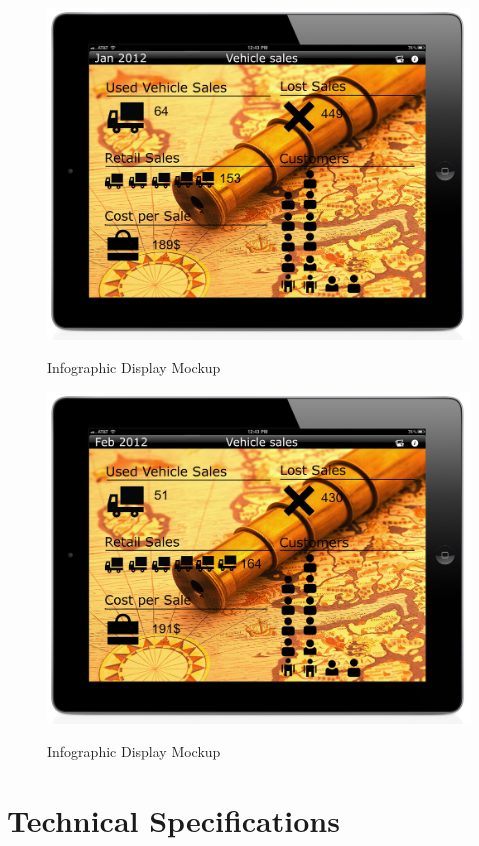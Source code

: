 \documentclass[11pt,a4paper,oneside]{article}
\begin{document}
\begin{figure}[!]
\caption{Infographic Display Mockup\label{mockup-infographic-display-2}}
\includegraphics[width=1\textwidth]{images/screen3.jpg}\\
\end{figure}

\begin{figure}[!]
\caption{Infographic Display Mockup\label{mockup-infographic-display-3}}
\includegraphics[width=1\textwidth]{images/screen4.jpg}\\
\end{figure}

\section{Technical Specifications}
\end{document}
